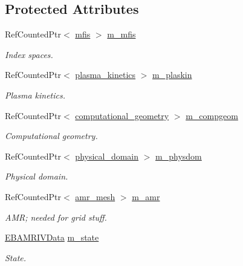 \subsection*{Protected Attributes}
\begin{DoxyCompactItemize}
\item 
Ref\+Counted\+Ptr$<$ \hyperlink{classmfis}{mfis} $>$ \hyperlink{classsigma__solver_a0c5488e3a54572b3724fecc0cb3d9496}{m\+\_\+mfis}
\begin{DoxyCompactList}\small\item\em Index spaces. \end{DoxyCompactList}\item 
Ref\+Counted\+Ptr$<$ \hyperlink{classplasma__kinetics}{plasma\+\_\+kinetics} $>$ \hyperlink{classsigma__solver_a6f7a5654ee018eaa52b544ffd0710688}{m\+\_\+plaskin}
\begin{DoxyCompactList}\small\item\em Plasma kinetics. \end{DoxyCompactList}\item 
Ref\+Counted\+Ptr$<$ \hyperlink{classcomputational__geometry}{computational\+\_\+geometry} $>$ \hyperlink{classsigma__solver_ae8b14974dacba915d5639ebb8aca2e77}{m\+\_\+compgeom}
\begin{DoxyCompactList}\small\item\em Computational geometry. \end{DoxyCompactList}\item 
Ref\+Counted\+Ptr$<$ \hyperlink{classphysical__domain}{physical\+\_\+domain} $>$ \hyperlink{classsigma__solver_adaa5b192aad33f3b4b8d561a62d04d94}{m\+\_\+physdom}
\begin{DoxyCompactList}\small\item\em Physical domain. \end{DoxyCompactList}\item 
Ref\+Counted\+Ptr$<$ \hyperlink{classamr__mesh}{amr\+\_\+mesh} $>$ \hyperlink{classsigma__solver_a532a075d343627ca06291ca12f3adfee}{m\+\_\+amr}
\begin{DoxyCompactList}\small\item\em A\+MR; needed for grid stuff. \end{DoxyCompactList}\item 
\hyperlink{type__definitions_8H_a6b8fa905d55cbb491b52180386f0e0c1}{E\+B\+A\+M\+R\+I\+V\+Data} \hyperlink{classsigma__solver_ad582336a89e3cd2efc764867c07396a8}{m\+\_\+state}
\begin{DoxyCompactList}\small\item\em State. \end{DoxyCompactList}\item 

\end{DoxyCompactItemize}
